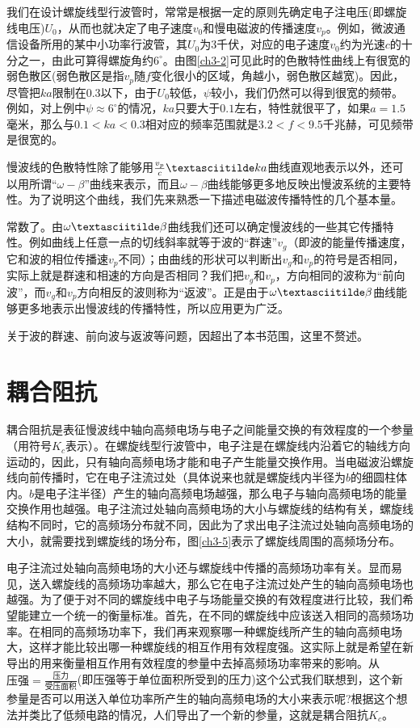 我们在设计螺旋线型行波管时，常常是根据一定的原则先确定电子注电压(即螺旋线电压)$ U_0 $，从而也就决定了电子速度$ v_0 $和慢电磁波的传播速度$ v_p $。例如，微波通信设备所用的某中小功率行波管，其$ U_0 $为3千伏，对应的电子速度$ v_0 $约为光速$ c $的十分之一，由此可算得螺旋角约$ 6^\circ $。由图\ref{ch3-2}可见此时的色散特性曲线上有很宽的弱色散区(弱色散区是指$ v_p $随$ f $变化很小的区域，角越小，弱色散区越宽)。因此，尽管把$ ka $限制在0.3以下，由于$ U_0 $较低，$ \psi $较小，我们仍然可以得到很宽的频带。例如，对上例中$ \psi \approx 6 ^\circ $的情况，$ ka $只要大于$ 0.1 $左右，特性就很平了，如果$ a=1.5 $毫米，那么与$ 0.1<ka<0.3 $相对应的频率范围就是$ 3.2<f<9.5 $千兆赫，可见频带是很宽的。

慢波线的色散特性除了能够用$ \frac{v_p}{c}\textasciitilde ka$曲线直观地表示以外，还可以用所谓“$\omega -\beta $”曲线来表示，而且$ \omega-\beta $曲线能够更多地反映出慢波系统的主要特性。为了说明这个曲线，我们先来熟悉一下描述电磁波传播特性的几个基本量。



常数了。由$ \omega \textasciitilde \beta $曲线我们还可以确定慢波线的一些其它传播特性。例如曲线上任意一点的切线斜率就等于波的“群速”$ v_g $（即波的能量传播速度，它和波的相位传播速$ v_p $不同）；由曲线的形状可以判断出$ v_g $和$ v_p $的符号是否相同，实际上就是群速和相速的方向是否相同？我们把$ v_g $和$ v_p $，方向相同的波称为“前向波”，而$ v_g $和$ v_p $方向相反的波则称为“返波”。正是由于$ \omega \textasciitilde \beta $曲线能够更多地表示出慢波线的传播特性，所以应用更为广泛。

关于波的群速、前向波与返波等问题，因超出了本书范围，这里不赘述。
\section{耦合阻抗}
耦合阻抗是表征慢波线中轴向高频电场与电子之间能量交换的有效程度的一个参量（用符号$ K_c $表示）。在螺旋线型行波管中，电子注是在螺旋线内沿着它的轴线方向运动的，因此，只有轴向高频电场才能和电子产生能量交换作用。当电磁波沿螺旋线向前传播时，它在电子注流过处（具体说来也就是螺旋线内半径为$ b $的细圆柱体内。$ b $是电子注半径）产生的轴向高频电场越强，那么电子与轴向高频电场的能量交换作用也越强。电子注流过处轴向高频电场的大小与螺旋线的结构有关，螺旋线结构不同时，它的高频场分布就不同，因此为了求出电子注流过处轴向高频电场的大小，就需要找到螺旋线的场分布，图\ref{ch3-5}表示了螺旋线周围的高频场分布。

电子注流过处轴向高频电场的大小还与螺旋线中传播的高频场功率有关。显而易见，送入螺旋线的高频场功率越大，那么它在电子注流过处产生的轴向高频电场也越强。为了便于对不同的螺旋线中电子与场能量交换的有效程度进行比较，我们希望能建立一个统一的衡量标准。首先，在不同的螺旋线中应该送入相同的高频场功率。在相同的高频场功率下，我们再来观察哪一种螺旋线所产生的轴向高频电场大，这样才能比较出哪一种螺旋线的相互作用有效程度强。这实际上就是希望在新导出的用来衡量相互作用有效程度的参量中去掉高频场功率带来的影响。从$\text{压强}= \frac{\text{压力}}{\text{受压面积}} $(即压强等于单位面积所受到的压力)这个公式我们联想到，这个新参量是否可以用送入单位功率所产生的轴向高频电场的大小来表示呢?根据这个想法并类比了低频电路的情况，人们导出了一个新的参量，这就是耦合阻抗$ K_c $。


